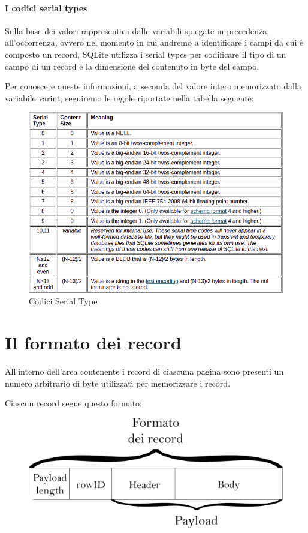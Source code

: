 \paragraph{I codici serial types}
\hfill \break
Sulla base dei valori rappresentati dalle variabili spiegate in precedenza, all'occorrenza, ovvero nel momento in cui andremo a identificare i campi da cui è composto un record, SQLite utilizza i serial types per codificare il tipo di un campo di un record e la dimensione del contenuto in byte del campo.

\medskip
\medskip
Per conoscere queste informazioni, a seconda del valore intero memorizzato dalla variabile varint, seguiremo le regole riportate nella tabella seguente:

\medskip
\begin{figure}[ht]
	\centerline{\includegraphics[scale=0.5, ]{assets/serialtypes}}
	\caption{Codici Serial Type}
	\label{fig:serialtypes}
	
\end{figure}

\section{Il formato dei record}
All'interno dell'area contenente i record di ciascuna pagina sono presenti un numero arbitrario di byte utilizzati per memorizzare i record.
\medskip

Ciascun record segue questo formato:
\begin{figure}[ht]
	\centerline{\includegraphics[scale=0.25, ]{assets/record_format}}
	\label{fig:recordformat}
\end{figure}


